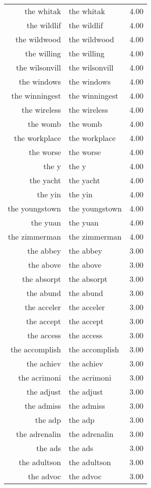\begin{table}[ht]
\begin{tabular}{rlr}
  the whitak & the whitak & 4.00 \\ 
  the wildlif & the wildlif & 4.00 \\ 
  the wildwood & the wildwood & 4.00 \\ 
  the willing & the willing & 4.00 \\ 
  the wilsonvill & the wilsonvill & 4.00 \\ 
  the windows & the windows & 4.00 \\ 
  the winningest & the winningest & 4.00 \\ 
  the wireless & the wireless & 4.00 \\ 
  the womb & the womb & 4.00 \\ 
  the workplace & the workplace & 4.00 \\ 
  the worse & the worse & 4.00 \\ 
  the y & the y & 4.00 \\ 
  the yacht & the yacht & 4.00 \\ 
  the yin & the yin & 4.00 \\ 
  the youngstown & the youngstown & 4.00 \\ 
  the yuan & the yuan & 4.00 \\ 
  the zimmerman & the zimmerman & 4.00 \\ 
  the abbey & the abbey & 3.00 \\ 
  the above & the above & 3.00 \\ 
  the absorpt & the absorpt & 3.00 \\ 
  the abund & the abund & 3.00 \\ 
  the acceler & the acceler & 3.00 \\ 
  the accept & the accept & 3.00 \\ 
  the access & the access & 3.00 \\ 
  the accomplish & the accomplish & 3.00 \\ 
  the achiev & the achiev & 3.00 \\ 
  the acrimoni & the acrimoni & 3.00 \\ 
  the adjust & the adjust & 3.00 \\ 
  the admiss & the admiss & 3.00 \\ 
  the adp & the adp & 3.00 \\ 
  the adrenalin & the adrenalin & 3.00 \\ 
  the ads & the ads & 3.00 \\ 
  the adultson & the adultson & 3.00 \\ 
  the advoc & the advoc & 3.00 \\ 

\end{tabular}
\end{table}
